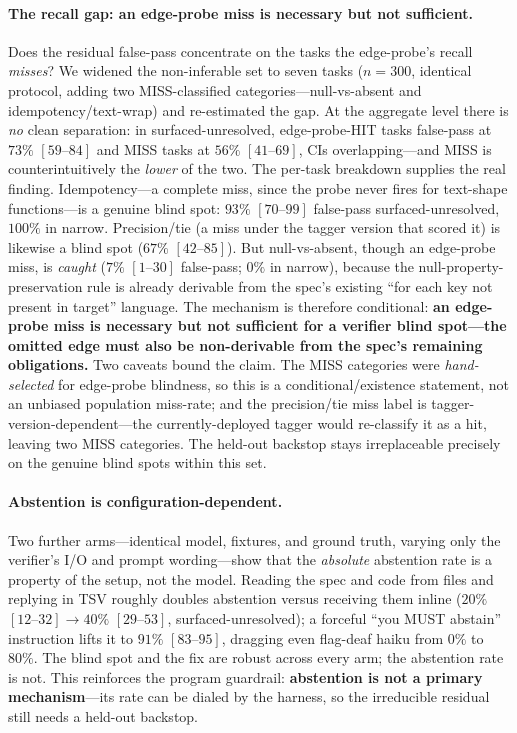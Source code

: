 \documentclass[11pt]{article}
\begin{document}
\paragraph{The recall gap: an edge-probe miss is necessary but not sufficient.}
Does the residual false-pass concentrate on the tasks the edge-probe's recall \emph{misses}? We widened
the non-inferable set to seven tasks ($n=300$, identical protocol, adding two MISS-classified
categories---null-vs-absent and idempotency/text-wrap) and re-estimated the gap. At the aggregate level
there is \emph{no} clean separation: in surfaced-unresolved, edge-probe-HIT tasks false-pass at $73\%$
$[59\text{--}84]$ and MISS tasks at $56\%$ $[41\text{--}69]$, CIs overlapping---and MISS is
counterintuitively the \emph{lower} of the two. The per-task breakdown supplies the real finding.
Idempotency---a complete miss, since the probe never fires for text-shape functions---is a genuine blind
spot: $93\%$ $[70\text{--}99]$ false-pass surfaced-unresolved, $100\%$ in narrow. Precision/tie (a miss
under the tagger version that scored it) is likewise a blind spot ($67\%$ $[42\text{--}85]$). But
null-vs-absent, though an edge-probe miss, is \emph{caught} ($7\%$ $[1\text{--}30]$ false-pass; $0\%$ in
narrow), because the null-property-preservation rule is already derivable from the spec's existing ``for
each key not present in target'' language. The mechanism is therefore conditional: \textbf{an edge-probe
miss is necessary but not sufficient for a verifier blind spot---the omitted edge must also be
non-derivable from the spec's remaining obligations.} Two caveats bound the claim. The MISS categories
were \emph{hand-selected} for edge-probe blindness, so this is a conditional/existence statement, not an
unbiased population miss-rate; and the precision/tie miss label is tagger-version-dependent---the
currently-deployed tagger would re-classify it as a hit, leaving two MISS categories. The held-out
backstop stays irreplaceable precisely on the genuine blind spots within this set.

\paragraph{Abstention is configuration-dependent.}
Two further arms---identical model, fixtures, and ground truth, varying only the verifier's I/O and
prompt wording---show that the \emph{absolute} abstention rate is a property of the setup, not the model.
Reading the spec and code from files and replying in TSV roughly doubles abstention versus receiving them
inline ($20\%$ $[12\text{--}32]\to40\%$ $[29\text{--}53]$, surfaced-unresolved); a forceful ``you MUST
abstain'' instruction lifts it to $91\%$ $[83\text{--}95]$, dragging even flag-deaf haiku from $0\%$ to
$80\%$. The blind spot and the fix are robust across every arm; the abstention rate is not. This
reinforces the program guardrail: \textbf{abstention is not a primary mechanism}---its rate can be dialed
by the harness, so the irreducible residual still needs a held-out backstop.
\end{document}
